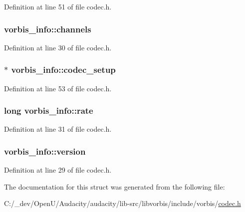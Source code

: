 Definition at line 51 of file codec.\+h.

\subsubsection[{\texorpdfstring{channels}{channels}}]{ vorbis\+\_\+info\+::channels}\hypertarget{structvorbis__info_a4240e042b91744b4fd810426f18252b4}{}\label{structvorbis__info_a4240e042b91744b4fd810426f18252b4}


Definition at line 30 of file codec.\+h.

\subsubsection[{\texorpdfstring{codec\+\_\+setup}{codec_setup}}]{$\ast$ vorbis\+\_\+info\+::codec\+\_\+setup}\hypertarget{structvorbis__info_a440988f081a417fd1586a4c3d44bc00c}{}\label{structvorbis__info_a440988f081a417fd1586a4c3d44bc00c}


Definition at line 53 of file codec.\+h.

\subsubsection[{\texorpdfstring{rate}{rate}}]{\setlength{\rightskip}{0pt plus 5cm}long vorbis\+\_\+info\+::rate}\hypertarget{structvorbis__info_a01879ed23ecd9605cf6779ef2663a681}{}\label{structvorbis__info_a01879ed23ecd9605cf6779ef2663a681}


Definition at line 31 of file codec.\+h.

\subsubsection[{\texorpdfstring{version}{version}}]{ vorbis\+\_\+info\+::version}\hypertarget{structvorbis__info_a2d832259b1e3fbf4d1cd619ab5743612}{}\label{structvorbis__info_a2d832259b1e3fbf4d1cd619ab5743612}


Definition at line 29 of file codec.\+h.



The documentation for this struct was generated from the following file\+:\begin{DoxyCompactItemize}
\item 
C\+:/\+\_\+dev/\+Open\+U/\+Audacity/audacity/lib-\/src/libvorbis/include/vorbis/\hyperlink{codec_8h}{codec.\+h}\end{DoxyCompactItemize}
